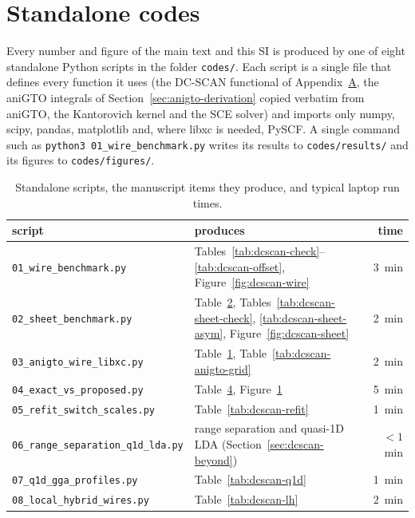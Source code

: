 \documentclass[journal=jctcce,manuscript=suppinfo]{achemso}
\begin{document}
\section{Standalone codes}
\label{sec:codes}
Every number and figure of the main text and this SI is produced by one of
eight standalone Python scripts in the folder \texttt{codes/}.  Each script is
a single file that defines every function it uses (the DC-SCAN functional of
Appendix~\href{main.pdf\#section*.6}{A}, the aniGTO integrals of
Section~\ref{sec:anigto-derivation} copied verbatim from aniGTO, the
Kantorovich kernel and the SCE solver) and imports only numpy, scipy,
pandas, matplotlib and, where libxc is needed, PySCF.  A single command such
as \texttt{python3 01\_wire\_benchmark.py} writes its results to
\texttt{codes/results/} and its figures to \texttt{codes/figures/}.
\begin{table}[H]
\centering
\caption{Standalone scripts, the manuscript items they produce, and typical
  laptop run times.}
\label{tab:codes}
\scriptsize
\begin{tabular}{@{}llr@{}}
\toprule
script & produces & time \\
\midrule
\texttt{01\_wire\_benchmark.py} & Tables~\ref{tab:dcscan-check}--\ref{tab:dcscan-offset}, Figure~\ref{fig:dcscan-wire} & 3~min \\
\texttt{02\_sheet\_benchmark.py} & Table~\href{main.pdf\#table.2}{2}, Tables~\ref{tab:dcscan-sheet-check}, \ref{tab:dcscan-sheet-asym}, Figure~\ref{fig:dcscan-sheet} & 2~min \\
\texttt{03\_anigto\_wire\_libxc.py} & Table~\href{main.pdf\#table.1}{1}, Table~\ref{tab:dcscan-anigto-grid} & 2~min \\
\texttt{04\_exact\_vs\_proposed.py} & Table~\href{main.pdf\#table.4}{4}, Figure~\href{main.pdf\#figure.caption.5}{1} & 5~min \\
\texttt{05\_refit\_switch\_scales.py} & Table~\ref{tab:dcscan-refit} & 1~min \\
\texttt{06\_range\_separation\_q1d\_lda.py} & range separation and quasi-1D LDA (Section~\ref{sec:dcscan-beyond}) & $<1$~min \\
\texttt{07\_q1d\_gga\_profiles.py} & Table~\ref{tab:dcscan-q1d} & 1~min \\
\texttt{08\_local\_hybrid\_wires.py} & Table~\ref{tab:dcscan-lh} & 2~min \\
\bottomrule
\end{tabular}
\end{table}
\end{document}

